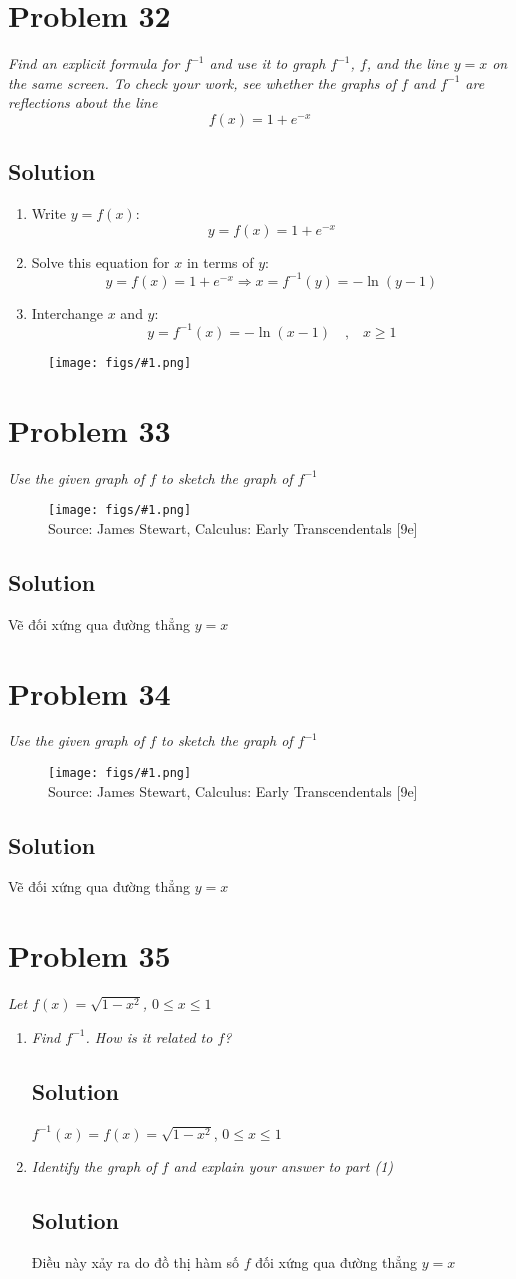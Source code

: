 \documentclass[11pt]{article}
\newcommand{\soln}{\subsection*}
\newcommand{\qn}{\textit}
\newcommand{\imagesource}[1]{{\footnotesize Source: #1}}
\newcommand{\imgqn}[1]{
	\begin{figure}[H]
		\centering
		\texttt{[image: figs/\#1.png]}\\
		\imagesource{James Stewart, Calculus: Early Transcendentals [9e]}
	\end{figure}
}
\newcommand{\imgsoln}[1]{
	\begin{figure}[H]
		\centering
		\texttt{[image: figs/\#1.png]}
	\end{figure}
}
\newcommand{\eqtext}[1]{\quad\text{#1}\quad}
\begin{document}
\section*{Problem 32}

\qn{Find an explicit formula for $f^{-1}$ and use it to graph $f^{-1}$, $f$, and the line $y=x$ on the same screen. To check your work, see whether the graphs of $f$ and $f^{-1}$ are reflections about the line $$f(x)=1+e^{-x}$$}

\soln{Solution}
\begin{enumerate}
	\item Write $y=f(x)$: $$y=f(x)=1+e^{-x}$$
	\item Solve this equation for $x$ in terms of $y$: $$y=f(x)=1+e^{-x} \Rightarrow x=f^{-1}(y)=-\ln(y-1)$$
	\item Interchange $x$ and $y$: $$y=f^{-1}(x)=-\ln(x-1) \eqtext{,} x \ge 1$$
\end{enumerate}
\imgsoln{1.5.32-ans}

\section*{Problem 33}

\qn{Use the given graph of $f$ to sketch the graph of $f^{-1}$}
\imgqn{1.5.33}

\soln{Solution}
Vẽ đối xứng qua đường thẳng $y=x$

\section*{Problem 34}

\qn{Use the given graph of $f$ to sketch the graph of $f^{-1}$}
\imgqn{1.5.34}

\soln{Solution}
Vẽ đối xứng qua đường thẳng $y=x$

\section*{Problem 35}

\qn{Let $f(x)=\sqrt{1-x^2}$, $0 \le x \le 1$}

\begin{enumerate}
	\item \qn{Find $f^{-1}$. How is it related to $f$?}
	\soln{Solution}
	$f^{-1}(x)=f(x)=\sqrt{1-x^2}$, $0 \le x \le 1$
	
	\item \qn{Identify the graph of $f$ and explain your answer to part (1)}
	\soln{Solution}
	Điều này xảy ra do đồ thị hàm số $f$ đối xứng qua đường thẳng $y=x$
\end{enumerate}
\end{document}
